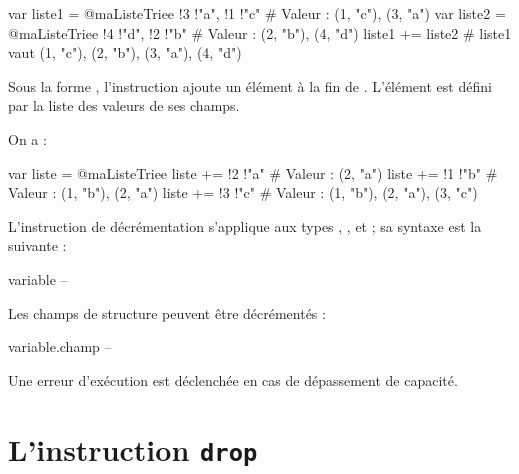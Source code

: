 \begin{galgascode}
var liste1 = @maListeTriee {!3 !"a", !1 !"c"} # Valeur : (1, "c"), (3, "a")
var liste2 = @maListeTriee {!4 !"d", !2 !"b"} # Valeur : (2, "b"), (4, "d")
liste1 += liste2 # liste1 vaut (1, "c"), (2, "b"), (3, "a"), (4, "d")
\end{galgascode}



Sous la forme , l'instruction ajoute un élément à la fin de . L'élément est défini par la liste des valeurs de ses champs.


On a :

\begin{galgascode}
var liste = @maListeTriee {}
liste += !2 !"a" # Valeur : (2, "a")
liste += !1 !"b" # Valeur : (1, "b"), (2, "a")
liste += !3 !"c" # Valeur : (1, "b"), (2, "a"), (3, "c")
\end{galgascode}















L'instruction de décrémentation s'applique aux types , ,  et  ; sa syntaxe est la suivante :
\begin{galgascode}
variable --
\end{galgascode}

Les champs de structure peuvent être décrémentés :
\begin{galgascode}
variable.champ --
\end{galgascode}

Une erreur d'exécution est déclenchée en cas de dépassement de capacité.







\section{L'instruction \texttt{drop}}

